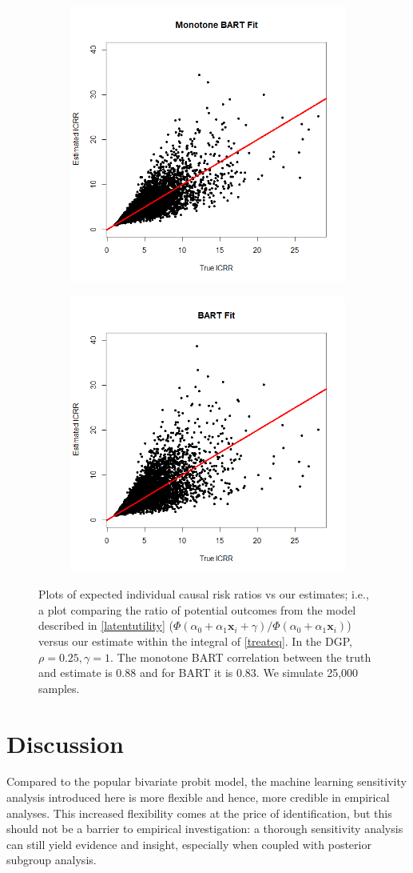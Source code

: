 \documentclass[aoas,preprint, 11pt, dvipsnames, table, x11name]{imsart}
\renewcommand{\bm}[1]{\mathbf{#1}}
\theoremstyle{remark}
\begin{document}
	\begin{figure}[t]
		\centering
		\begin{subfigure}{.4\textwidth}
			\includegraphics[width=5.cm]{monobart_ICRR_png.png}
		\end{subfigure}%
		\begin{subfigure}{.4\textwidth}
			\includegraphics[width=5.cm]{Bart_ICRR_png.png}
		\end{subfigure}
		\caption[Comparing Bart with and without monotonicity constraint]{Plots of expected individual causal risk ratios vs our estimates; i.e., a plot comparing the ratio of potential outcomes from the model described in \autoref{latentutility} ($\Phi(\alpha_0+\alpha_1\bm{x}_i+\gamma)/\Phi(\alpha_0+\alpha_1\bm{x}_i)$) versus our estimate within the integral of \autoref{treateq}.  In the DGP, $\rho=0.25,\gamma=1$.  The monotone BART correlation between the truth and estimate is 0.88 and for BART it is 0.83. We simulate 25,000 samples.}
		\label{monovsnorm}
	\end{figure}
	
	
	\section{Discussion}


	Compared to the popular bivariate probit model, the machine learning sensitivity analysis introduced here is more flexible and hence, more credible in empirical analyses. This increased flexibility comes at the price of identification, but this should not be a barrier to empirical investigation: a thorough sensitivity analysis can still yield evidence and insight, especially when coupled with posterior subgroup analysis.
	
\end{document}
